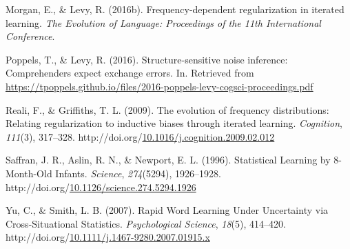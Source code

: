 \documentclass[10pt, letterpaper]{article}
\newenvironment{CSLReferences}%
  {}%
  {\par}
\begin{document}
\begin{CSLReferences}{1}{0}
\leavevmode{}%
Morgan, E., \& Levy, R. (2016b). Frequency-dependent regularization in
iterated learning. \emph{The Evolution of Language: Proceedings of the
11th International Conference}.

\leavevmode{}%
Poppels, T., \& Levy, R. (2016). Structure-sensitive noise inference:
Comprehenders expect exchange errors. In. Retrieved from
\url{https://tpoppels.github.io/files/2016-poppels-levy-cogsci-proceedings.pdf}

\leavevmode{}%
Reali, F., \& Griffiths, T. L. (2009). The evolution of frequency
distributions: Relating regularization to inductive biases through
iterated learning. \emph{Cognition}, \emph{111}(3), 317--328.
http://doi.org/\href{https://doi.org/10.1016/j.cognition.2009.02.012}{10.1016/j.cognition.2009.02.012}

\leavevmode{}%
Saffran, J. R., Aslin, R. N., \& Newport, E. L. (1996). Statistical
Learning by 8-Month-Old Infants. \emph{Science}, \emph{274}(5294),
1926--1928.
http://doi.org/\href{https://doi.org/10.1126/science.274.5294.1926}{10.1126/science.274.5294.1926}

\leavevmode{}%
Yu, C., \& Smith, L. B. (2007). Rapid Word Learning Under Uncertainty
via Cross-Situational Statistics. \emph{Psychological Science},
\emph{18}(5), 414--420.
http://doi.org/\href{https://doi.org/10.1111/j.1467-9280.2007.01915.x}{10.1111/j.1467-9280.2007.01915.x}

\end{CSLReferences}


\end{document}
